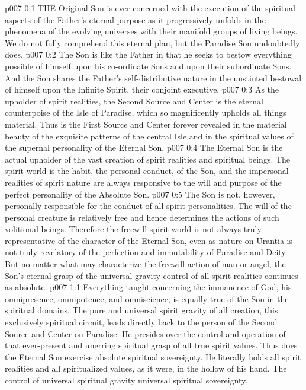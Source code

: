 \vs p007 0:1 THE Original Son is ever concerned with the execution of the spiritual aspects of the Father’s eternal purpose as it progressively unfolds in the phenomena of the evolving universes with their manifold groups of living beings. We do not fully comprehend this eternal plan, but the Paradise Son undoubtedly does.
\vs p007 0:2 The Son is like the Father in that he seeks to bestow everything possible of himself upon his co\hyp{}ordinate Sons and upon their subordinate Sons. And the Son shares the Father’s self\hyp{}distributive nature in the unstinted bestowal of himself upon the Infinite Spirit, their conjoint executive.
\vs p007 0:3 \pc As the upholder of spirit realities, the Second Source and Center is the eternal counterpoise of the Isle of Paradise, which so magnificently upholds all things material. Thus is the First Source and Center forever revealed in the material beauty of the exquisite patterns of the central Isle and in the spiritual values of the supernal personality of the Eternal Son.
\vs p007 0:4 \pc The Eternal Son is the actual upholder of the vast creation of spirit realities and spiritual beings. The spirit world is the habit, the personal conduct, of the Son, and the impersonal realities of spirit nature are always responsive to the will and purpose of the perfect personality of the Absolute Son.
\vs p007 0:5 The Son is not, however, personally responsible for the conduct of all spirit personalities. The will of the personal creature is relatively free and hence determines the actions of such volitional beings. Therefore the freewill spirit world is not always truly representative of the character of the Eternal Son, even as nature on Urantia is not truly revelatory of the perfection and immutability of Paradise and Deity. But no matter what may characterize the freewill action of man or angel, the Son’s eternal grasp of the universal gravity control of all spirit realities continues as absolute.
\vs p007 1:1 Everything taught concerning the immanence of God, his omnipresence, omnipotence, and omniscience, is equally true of the Son in the spiritual domains. The pure and universal spirit gravity of all creation, this exclusively spiritual circuit, leads directly back to the person of the Second Source and Center on Paradise. He presides over the control and operation of that ever\hyp{}present and unerring spiritual grasp of all true spirit values. Thus does the Eternal Son exercise absolute spiritual sovereignty. He literally holds all spirit realities and all spiritualized values, as it were, in the hollow of his hand. The control of universal spiritual gravity  universal spiritual sovereignty.
